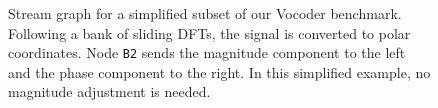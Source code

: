 
\begin{figure}[t]
\centering
{}
\vspace{-24pt}
\caption{Stream graph for a simplified subset of our Vocoder
benchmark.  Following a bank of sliding DFTs, the signal is converted
to polar coordinates.  Node {\tt B2} sends the magnitude component to
the left and the phase component to the right.  In this simplified
example, no magnitude adjustment is needed.\label{fig:vocoder}}
\vspace{-12pt}
\end{figure}

\begin{figure*}[t]
\caption{Parallel execution models for stream programs.  Each block corresponds to a filter in the Vocoder example (Figure~\ref{fig:vocoder}).  The height of the block reflects the amount of work contained in the filter.\label{fig:exemodel}}
\end{figure*}
